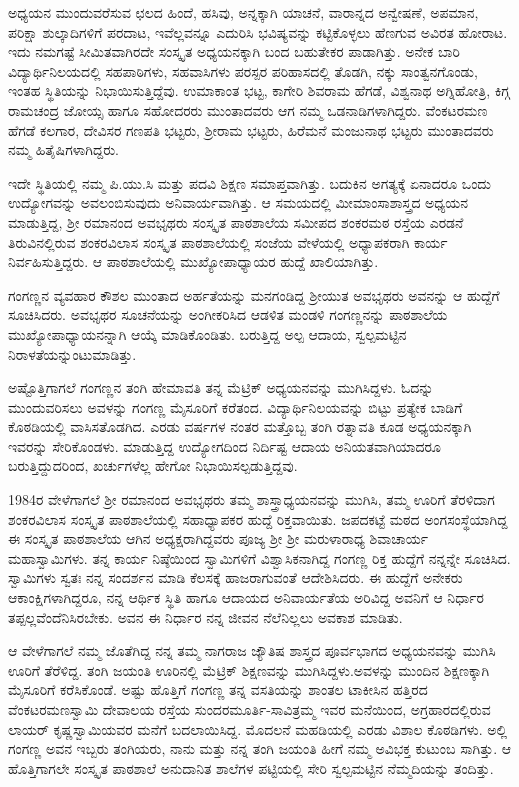 ಅಧ್ಯಯನ ಮುಂದುವರೆಸುವ ಛಲದ ಹಿಂದೆ, ಹಸಿವು, ಅನ್ನಕ್ಕಾಗಿ ಯಾಚನೆ, ವಾರಾನ್ನದ ಅನ್ವೇಷಣೆ, ಅಪಮಾನ, ಪರಿಕ್ಷಾ ಶುಲ್ಕಾದಿಗಳಿಗೆ ಪರದಾಟ, ಇವೆಲ್ಲವನ್ನೂ ಎದುರಿಸಿ ಭವಿಷ್ಯವನ್ನು ಕಟ್ಟಿಕೊಳ್ಳಲು ಹೆಣಗುವ ಅವಿರತ ಹೋರಾಟ. ಇದು ನಮಗಷ್ಟೆ ಸೀಮಿತವಾಗಿರದೇ ಸಂಸ್ಕೃತ ಅಧ್ಯಯನಕ್ಕಾಗಿ ಬಂದ ಬಹುತೇಕರ ಪಾಡಾಗಿತ್ತು. ಅನೇಕ ಬಾರಿ ವಿದ್ಯಾರ್ಥಿನಿಲಯದಲ್ಲಿ ಸಹಪಾಠಿಗಳು, ಸಹವಾಸಿಗಳು ಪರಸ್ಪರ ಪರಿಹಾಸದಲ್ಲಿ ತೊಡಗಿ, ನಕ್ಕು ಸಾಂತ್ವನಗೊಂಡು, ಇಂತಹ ಸ್ಥಿತಿಯನ್ನು ನಿಭಾಯಿಸುತ್ತಿದ್ದೆವು. ಉಮಾಕಾಂತ ಭಟ್ಟ, ಕಾಗೇರಿ ಶಿವರಾಮ ಹೆಗಡೆ, ವಿಶ್ವನಾಥ ಅಗ್ನಿಹೋತ್ರಿ, ಕಿಗ್ಗ ರಾಮಚಂದ್ರ ಜೋಯ್ಸ ಹಾಗೂ ಸಹೋದರರು ಮುಂತಾದವರು ಆಗ ನಮ್ಮ ಒಡನಾಡಿಗಳಾಗಿದ್ದರು. ವೆಂಕಟರಮಣ ಹೆಗಡೆ ಕಲಗಾರ, ದೇವಿಸರ ಗಣಪತಿ ಭಟ್ಟರು, ಶ್ರೀರಾಮ ಭಟ್ಟರು, ಹಿರೆಮನೆ ಮಂಜುನಾಥ ಭಟ್ಟರು ಮುಂತಾದವರು ನಮ್ಮ ಹಿತೈಷಿಗಳಾಗಿದ್ದರು.

ಇದೇ ಸ್ಥಿತಿಯಲ್ಲಿ ನಮ್ಮ ಪಿ.ಯು.ಸಿ ಮತ್ತು ಪದವಿ ಶಿಕ್ಷಣ ಸಮಾಪ್ತವಾಗಿತ್ತು. ಬದುಕಿನ ಅಗತ್ಯಕ್ಕೆ ಏನಾದರೂ ಒಂದು  ಉದ್ಯೋಗವನ್ನು ಅವಲಂಬಿಸುವುದು ಅನಿವಾರ್ಯವಾಗಿತ್ತು. ಆ ಸಮಯದಲ್ಲಿ ಮೀಮಾಂಸಾಶಾಸ್ತ್ರದ ಅಧ್ಯಯನ ಮಾಡುತ್ತಿದ್ದ, ಶ್ರೀ ರಮಾನಂದ ಅವಭೃಥರು ಸಂಸ್ಕೃತ ಪಾಠಶಾಲೆಯ ಸಮೀಪದ ಶಂಕರಮಠ ರಸ್ತೆಯ ಎರಡನೆ ತಿರುವಿನಲ್ಲಿರುವ ಶಂಕರವಿಲಾಸ ಸಂಸ್ಕೃತ ಪಾಠಶಾಲೆಯಲ್ಲಿ ಸಂಜೆಯ ವೇಳೆಯಲ್ಲಿ ಅಧ್ಯಾಪಕರಾಗಿ ಕಾರ್ಯ ನಿರ್ವಹಿಸುತ್ತಿದ್ದರು. ಆ ಪಾಠಶಾಲೆಯಲ್ಲಿ ಮುಖ್ಯೋಪಾಧ್ಯಾಯರ ಹುದ್ದೆ ಖಾಲಿಯಾಗಿತ್ತು. 

ಗಂಗಣ್ಣನ ವ್ಯವಹಾರ ಕೌಶಲ ಮುಂತಾದ ಅರ್ಹತೆಯನ್ನು ಮನಗಂಡಿದ್ದ ಶ್ರೀಯುತ ಅವಭೃಥರು ಅವನನ್ನು ಆ ಹುದ್ದೆಗೆ ಸೂಚಿಸಿದರು. ಅವಭೃಥರ ಸೂಚನೆಯನ್ನು ಅಂಗೀಕರಿಸಿದ ಆಡಳಿತ ಮಂಡಳಿ ಗಂಗಣ್ಣನನ್ನು ಪಾಠಶಾಲೆಯ ಮುಖ್ಯೋಪಾಧ್ಯಾಯನನ್ನಾಗಿ ಆಯ್ಕೆ ಮಾಡಿಕೊಂಡಿತು. ಬರುತ್ತಿದ್ದ ಅಲ್ಪ ಆದಾಯ, ಸ್ವಲ್ಪಮಟ್ಟಿನ ನಿರಾಳತೆಯನ್ನುಂಟುಮಾಡಿತ್ತು.

ಅಷ್ಟೊತ್ತಿಗಾಗಲೆ ಗಂಗಣ್ಣನ ತಂಗಿ ಹೇಮಾವತಿ ತನ್ನ ಮೆಟ್ರಿಕ್ ಅಧ್ಯಯನವನ್ನು ಮುಗಿಸಿದ್ದಳು. ಓದನ್ನು ಮುಂದುವರಿಸಲು  ಅವಳನ್ನು ಗಂಗಣ್ಣ ಮೈಸೂರಿಗೆ ಕರೆತಂದ. ವಿದ್ಯಾರ್ಥಿನಿಲಯವನ್ನು ಬಿಟ್ಟು ಪ್ರತ್ಯೇಕ ಬಾಡಿಗೆ ಕೊಠಡಿಯಲ್ಲಿ ವಾಸಿಸತೊಡಗಿದ. ಎರಡು ವರ್ಷಗಳ ನಂತರ ಮತ್ತೊಬ್ಬ ತಂಗಿ ರತ್ನಾವತಿ ಕೂಡ ಅಧ್ಯಯನಕ್ಕಾಗಿ ಇವರನ್ನು ಸೇರಿಕೊಂಡಳು. ಮಾಡುತ್ತಿದ್ದ ಉದ್ಯೋಗದಿಂದ ನಿರ್ದಿಷ್ಟ ಆದಾಯ ಅನಿಯತವಾಗಿಯಾದರೂ ಬರುತ್ತಿದ್ದುದರಿಂದ, ಖರ್ಚುಗಳೆಲ್ಲ ಹೇಗೋ ನಿಭಾಯಿಸಲ್ಪಡುತ್ತಿದ್ದವು.

1984ರ ವೇಳೆಗಾಗಲೆ ಶ್ರೀ ರಮಾನಂದ ಅವಭೃಥರು ತಮ್ಮ ಶಾಸ್ತ್ರಾಧ್ಯಯನವನ್ನು ಮುಗಿಸಿ, ತಮ್ಮ ಊರಿಗೆ ತೆರಳಿದಾಗ ಶಂಕರವಿಲಾಸ ಸಂಸ್ಕೃತ ಪಾಠಶಾಲೆಯಲ್ಲಿ ಸಹಾಧ್ಯಾಪಕರ ಹುದ್ದೆ ರಿಕ್ತವಾಯಿತು. ಜಪದಕಟ್ಟೆ ಮಠದ ಅಂಗಸಂಸ್ಥೆಯಾಗಿದ್ದ ಈ ಸಂಸ್ಕೃತ ಪಾಠಶಾಲೆಯ ಆಗಿನ ಅಧ್ಯಕ್ಷರಾಗಿದ್ದವರು ಪೂಜ್ಯ ಶ್ರೀ ಶ್ರೀ ಮರುಳಾರಾಧ್ಯ ಶಿವಾಚಾರ್ಯ ಮಹಾಸ್ವಾಮಿಗಳು. ತನ್ನ ಕಾರ್ಯ ನಿಷ್ಠೆಯಿಂದ ಸ್ವಾಮಿಗಳಿಗೆ ವಿಶ್ವಾಸಿಕನಾಗಿದ್ದ ಗಂಗಣ್ಣ ರಿಕ್ತ ಹುದ್ದೆಗೆ ನನ್ನನ್ನೇ ಸೂಚಿಸಿದ. ಸ್ವಾಮಿಗಳು ಸ್ವತಃ ನನ್ನ ಸಂದರ್ಶನ ಮಾಡಿ ಕೆಲಸಕ್ಕೆ ಹಾಜರಾಗುವಂತೆ ಆದೇಶಿಸಿದರು. ಈ ಹುದ್ದೆಗೆ ಅನೇಕರು ಆಕಾಂಕ್ಷಿಗಳಾಗಿದ್ದರೂ, ನನ್ನ ಆರ್ಥಿಕ ಸ್ಥಿತಿ ಹಾಗೂ ಆದಾಯದ ಅನಿವಾರ್ಯತೆಯ ಅರಿವಿದ್ದ ಅವನಿಗೆ ಆ ನಿರ್ಧಾರ ತಪ್ಪಲ್ಲವೆಂದೆನಿಸಿರಬೇಕು. ಅವನ ಈ ನಿರ್ಧಾರ ನನ್ನ ಜೀವನ ನೆಲೆನಿಲ್ಲಲು ಅವಕಾಶ ಮಾಡಿತು.

ಆ ವೇಳೆಗಾಗಲೆ ನಮ್ಮ ಜೊತೆಗಿದ್ದ ನನ್ನ ತಮ್ಮ ನಾಗರಾಜ ಜ್ಯೌತಿಷ ಶಾಸ್ತ್ರದ ಪೂರ್ವಭಾಗದ ಅಧ್ಯಯನವನ್ನು ಮುಗಿಸಿ ಊರಿಗೆ ತೆರೆಳಿದ್ದ. ತಂಗಿ ಜಯಂತಿ ಊರಿನಲ್ಲಿ ಮೆಟ್ರಿಕ್ ಶಿಕ್ಷಣವನ್ನು ಮುಗಿಸಿದ್ದಳು.ಅವಳನ್ನು ಮುಂದಿನ ಶಿಕ್ಷಣಕ್ಕಾಗಿ ಮೈಸೂರಿಗೆ ಕರೆಸಿಕೊಂಡೆ. ಅಷ್ಟು ಹೊತ್ತಿಗೆ ಗಂಗಣ್ಣ ತನ್ನ ವಸತಿಯನ್ನು ಶಾಂತಲ ಟಾಕೀಸಿನ ಹತ್ತಿರದ ವೆಂಕಟರಮಣಸ್ವಾಮಿ ದೇವಾಲಯ ರಸ್ತೆಯ ಸುಂದರಮೂರ್ತಿ-ಸಾವಿತ್ರಮ್ಮ ಇವರ ಮನೆಯಿಂದ, ಅಗ್ರಹಾರದಲ್ಲಿರುವ ಲಾಯರ್ ಕೃಷ್ಣಸ್ವಾಮಿಯವರ ಮನೆಗೆ ಬದಲಾಯಿಸಿದ್ದ. ಮೊದಲನೆ ಮಹಡಿಯಲ್ಲಿ ಎರಡು ವಿಶಾಲ ಕೊಠಡಿಗಳು. ಅಲ್ಲಿ ಗಂಗಣ್ಣ ಅವನ ಇಬ್ಬರು ತಂಗಿಯರು, ನಾನು ಮತ್ತು ನನ್ನ ತಂಗಿ ಜಯಂತಿ ಹೀಗೆ ನಮ್ಮ ಅವಿಭಕ್ತ ಕುಟುಂಬ ಸಾಗಿತ್ತು. ಆ ಹೊತ್ತಿಗಾಗಲೇ ಸಂಸ್ಕೃತ ಪಾಠಶಾಲೆ ಅನುದಾನಿತ ಶಾಲೆಗಳ ಪಟ್ಟಿಯಲ್ಲಿ ಸೇರಿ ಸ್ವಲ್ಪಮಟ್ಟಿನ ನೆಮ್ಮದಿಯನ್ನು ತಂದಿತ್ತು.

